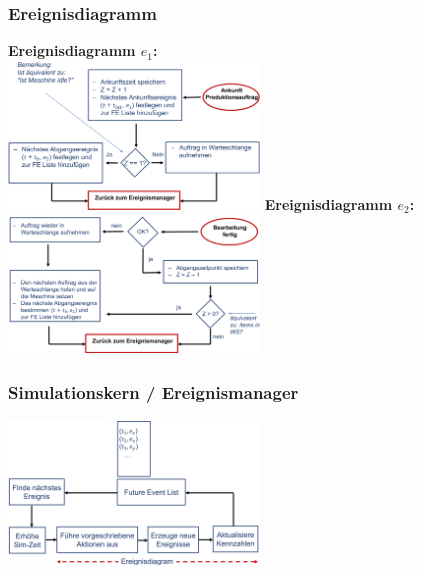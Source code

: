 \subsubsection{Ereignisdiagramm}
\begin{example} 
	\begin{multicols}{2}
		\textbf{Ereignisdiagramm $e_1$:} \\
		\includegraphics[width=0.5\textwidth]{pictures/ereignisdiagramm1}
		\textbf{Ereignisdiagramm $e_2$:} \\
		\includegraphics[width=0.5\textwidth]{pictures/ereignisdiagramm2}
	\end{multicols}
\end{example}

\subsubsection{Simulationskern / Ereignismanager}
\includegraphics[width=0.5\textwidth]{pictures/ereignismanager}

